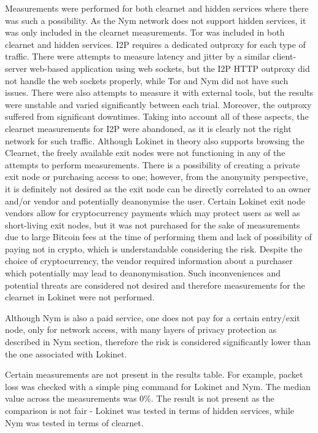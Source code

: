 Measurements were performed for both clearnet and hidden services where there was such a possibility. As the Nym network does not support hidden services, it was only included in the clearnet measurements. Tor was included in both clearnet and hidden services. I2P requires a dedicated outproxy for each type of traffic. There were attempts to measure latency and jitter by a similar client-server web-based application using web sockets, but the I2P HTTP outproxy did not handle the web sockets properly, while Tor and Nym did not have such issues. There were also attempts to measure it with external tools, but the results were unstable and varied significantly between each trial. Moreover, the outproxy suffered from significant downtimes. Taking into account all of these aspects, the clearnet measurements for I2P were abandoned, as it is clearly not the right network for such traffic. Although Lokinet in theory also supports browsing the Clearnet, the freely available exit nodes were not functioning in any of the attempts to perform measurements. There is a possibility of creating a private exit node or purchasing access to one; however, from the anonymity perspective, it is definitely not desired as the exit node can be directly correlated to an owner and/or vendor and potentially deanonymise the user. Certain Lokinet exit node vendors allow for cryptocurrency payments which may protect users as well as short-living exit nodes, but it was not purchased for the sake of measurements due to large Bitcoin fees at the time of performing them and lack of possibility of paying not in crypto, which is understandable considering the risk. Despite the choice of cryptocurrency, the vendor required information about a purchaser which potentially may lead to deanonymisation. Such inconveniences and potential threats are considered not desired and therefore measurements for the clearnet in Lokinet were not performed. 

Although Nym is also a paid service, one does not pay for a certain entry/exit node, only for network access, with many layers of privacy protection as described in Nym section, therefore the risk is considered significantly lower than the one associated with Lokinet.

Certain measurements are not present in the results table. For example, packet loss was checked with a simple ping command for Lokinet and Nym. The median value across the measurements was 0\%. The result is not present as the comparison is not fair - Lokinet was tested in terms of hidden services, while Nym was tested in terms of clearnet.

